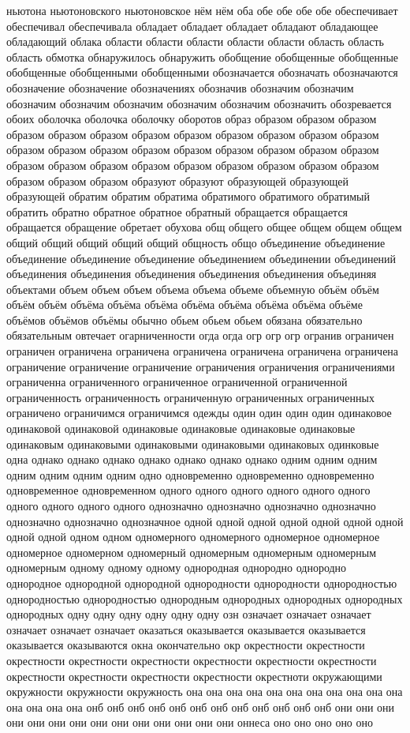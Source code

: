 ньютона ньютоновского ньютоновское нём нём оба обе обе обе обе обеспечивает обеспечивал обеспечивала обладает обладает обладает обладают обладающее обладающий облака области области области области области область область область обмотка обнаружилось обнаружить обобщение обобщенные обобщенные обобщенные обобщенными обобщенными обозначается обозначать обозначаются обозначение обозначение обозначениях обозначив обозначим обозначим обозначим обозначим обозначим обозначим обозначим обозначить обозревается обоих оболочка оболочка оболочку оборотов образ образом образом образом образом образом образом образом образом образом образом образом образом образом образом образом образом образом образом образом образом образом образом образом образом образом образом образом образом образом образом образом образом образом образуют образуют образующей образующей образующей обратим обратим обратима обратимого обратимого обратимый обратить обратно обратное обратное обратный обращается обращается обращается обращение обретает обухова общ общего общее общем общем общем общий общий общий общий общий общность общо объединение объединение объединение объединение объединение объединением объединении объединений объединения объединения объединения объединения объединения объединяя объектами объем объем объем объема объема объеме объемную объём объём объём объём объёма объёма объёма объёма объёма объёма объёма объёме объёмов объёмов объёмы обычно обьем обьем обьем обязана обязательно обязательным овтечает огарниченности огда огда огр огр огр огранив ограничен ограничен ограничена ограничена ограничена ограничена ограничена ограничена ограничение ограничение ограничение ограничения ограничения ограничениями ограниченна ограниченного ограниченное ограниченной ограниченной ограниченность ограниченность ограниченную ограниченных ограниченных ограничено ограничимся ограничимся одежды один один один один одинаковое одинаковой одинаковой одинаковые одинаковые одинаковые одинаковые одинаковым одинаковыми одинаковыми одинаковыми одинаковых одинковые одна однако однако однако однако однако однако однако одним одним одним одним одним одним одним одно одновременно одновременно одновременно одновременное одновременном одного одного одного одного одного одного одного одного одного одного однозначно однозначно однозначно однозначно однозначно однозначно однозначное одной одной одной одной одной одной одной одной одной одном одном одномерного одномерного одномерное одномерное одномерное одномерном одномерный одномерным одномерным одномерным одномерным одному одному одному однородная однородно однородно однородное однородной однородной однородности однородности однородностью однородностью однородностью однородным однородных однородных однородных однородных одну одну одну одну одну одну озн означает означает означает означает означает означает оказаться оказывается оказывается оказывается оказывается оказываются окна окончательно окр окрестности окрестности окрестности окрестности окрестности окрестности окрестности окрестности окрестности окрестности окрестности окрестности окрестноти окружающими окружности окружности окружность она она она она она она она она она она она она она она она онб онб онб онб онб онб онб онб онб онб онб онб они они они они они они они они они они они они они они оннеса оно оно оно оно оно 